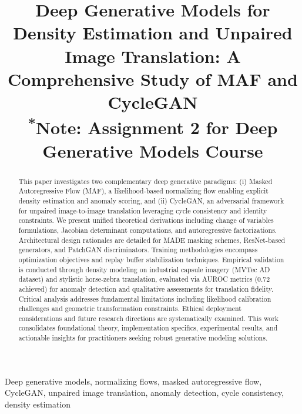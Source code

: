 \documentclass[conference]{IEEEtran}
\begin{document}
\title{Deep Generative Models for Density Estimation and Unpaired Image Translation: A Comprehensive Study of MAF and CycleGAN\\
{\footnotesize \textsuperscript{*}Note: Assignment 2 for Deep Generative Models Course}
}

\author{
}

\maketitle

\begin{abstract}
This paper investigates two complementary deep generative paradigms: (i) Masked Autoregressive Flow (MAF), a likelihood-based normalizing flow enabling explicit density estimation and anomaly scoring, and (ii) CycleGAN, an adversarial framework for unpaired image-to-image translation leveraging cycle consistency and identity constraints. We present unified theoretical derivations including change of variables formulations, Jacobian determinant computations, and autoregressive factorizations. Architectural design rationales are detailed for MADE masking schemes, ResNet-based generators, and PatchGAN discriminators. Training methodologies encompass optimization objectives and replay buffer stabilization techniques. Empirical validation is conducted through density modeling on industrial capsule imagery (MVTec AD dataset) and stylistic horse-zebra translation, evaluated via AUROC metrics (0.72 achieved) for anomaly detection and qualitative assessments for translation fidelity. Critical analysis addresses fundamental limitations including likelihood calibration challenges and geometric transformation constraints. Ethical deployment considerations and future research directions are systematically examined. This work consolidates foundational theory, implementation specifics, experimental results, and actionable insights for practitioners seeking robust generative modeling solutions.
\end{abstract}

\begin{IEEEkeywords}
Deep generative models, normalizing flows, masked autoregressive flow, CycleGAN, unpaired image translation, anomaly detection, cycle consistency, density estimation
\end{IEEEkeywords}
\end{document}
